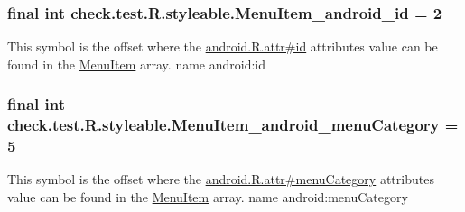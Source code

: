 \subsubsection[{Menu\+Item\+\_\+android\+\_\+id}]{\setlength{\rightskip}{0pt plus 5cm}final int check.\+test.\+R.\+styleable.\+Menu\+Item\+\_\+android\+\_\+id = 2\hspace{0.3cm}{\ttfamily [static]}}\label{classcheck_1_1test_1_1_r_1_1styleable_a59b9e4a6fb4718026e0941ce96cbb5b6}
This symbol is the offset where the \hyperlink{}{android.\+R.\+attr\#id} attribute\textquotesingle{}s value can be found in the \hyperlink{classcheck_1_1test_1_1_r_1_1styleable_af26376072eab01d1b4197e48992dc936}{Menu\+Item} array.  name android\+:id \hypertarget{classcheck_1_1test_1_1_r_1_1styleable_a0fe0f490126cfec187176b2dd0855360}{}
\subsubsection[{Menu\+Item\+\_\+android\+\_\+menu\+Category}]{\setlength{\rightskip}{0pt plus 5cm}final int check.\+test.\+R.\+styleable.\+Menu\+Item\+\_\+android\+\_\+menu\+Category = 5\hspace{0.3cm}{\ttfamily [static]}}\label{classcheck_1_1test_1_1_r_1_1styleable_a0fe0f490126cfec187176b2dd0855360}
This symbol is the offset where the \hyperlink{}{android.\+R.\+attr\#menu\+Category} attribute\textquotesingle{}s value can be found in the \hyperlink{classcheck_1_1test_1_1_r_1_1styleable_af26376072eab01d1b4197e48992dc936}{Menu\+Item} array.  name android\+:menu\+Category \hypertarget{classcheck_1_1test_1_1_r_1_1styleable_ab191ae989550111a8c237ae16c0edddb}{}
